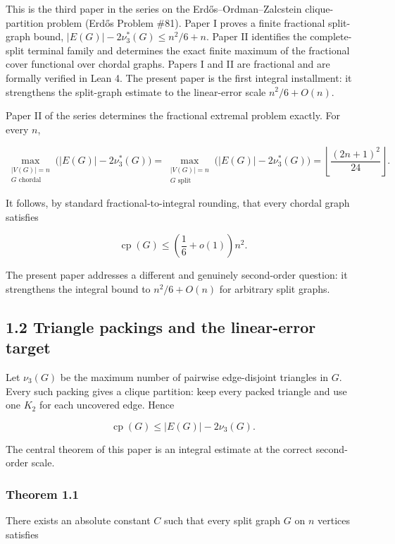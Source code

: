 \documentclass[
  11pt,
]{article}
\begin{document}
This is the third paper in the series on the Erdős--Ordman--Zalcstein
clique-partition problem (Erdős Problem \#81). Paper I proves a finite
fractional split-graph bound, \(|E(G)|-2\nu_3^*(G)\le n^2/6+n\). Paper
II identifies the complete-split terminal family and determines the
exact finite maximum of the fractional cover functional over chordal
graphs. Papers I and II are fractional and are formally verified in Lean
4. The present paper is the first integral installment: it strengthens
the split-graph estimate to the linear-error scale \(n^2/6+O(n)\).

Paper II of the series determines the fractional extremal problem
exactly. For every \(n\),

\[
\max_{\substack{|V(G)|=n\\G\text{ chordal}}}
\bigl(|E(G)|-2\nu_3^*(G)\bigr)
=
\max_{\substack{|V(G)|=n\\G\text{ split}}}
\bigl(|E(G)|-2\nu_3^*(G)\bigr)
=
\left\lfloor\frac{(2n+1)^2}{24}\right\rfloor.
\]

It follows, by standard fractional-to-integral rounding, that every
chordal graph satisfies

\[
\operatorname{cp}(G)
\le
\left(\frac16+o(1)\right)n^2.
\]

The present paper addresses a different and genuinely second-order
question: it strengthens the integral bound to \(n^2/6+O(n)\) for
arbitrary split graphs.

\subsection{1.2 Triangle packings and the linear-error
target}\label{triangle-packings-and-the-linear-error-target}

Let \(\nu_3(G)\) be the maximum number of pairwise edge-disjoint
triangles in \(G\). Every such packing gives a clique partition: keep
every packed triangle and use one \(K_2\) for each uncovered edge. Hence

\[
\operatorname{cp}(G)
\le
|E(G)|-2\nu_3(G).
\tag{1.1}
\]

The central theorem of this paper is an integral estimate at the correct
second-order scale.

\subsubsection{Theorem 1.1}\label{theorem-1.1-linear-error-split-graph-theorem}

There exists an absolute constant \(C\) such that every split graph
\(G\) on \(n\) vertices satisfies
\end{document}
